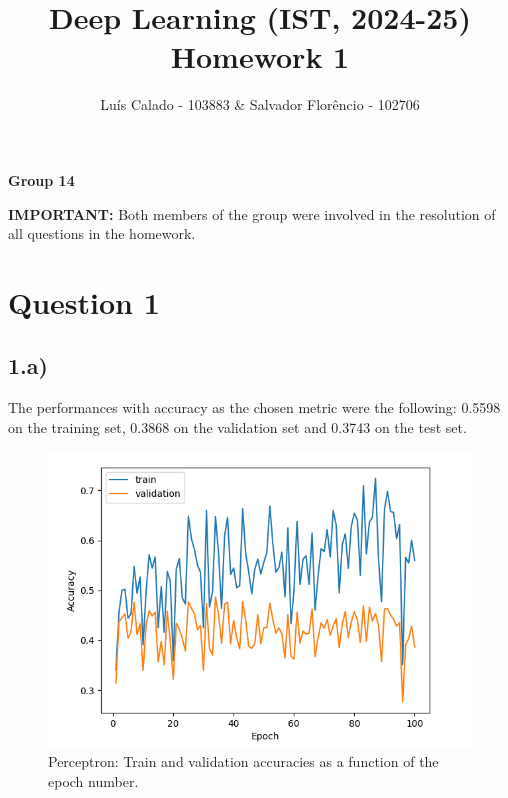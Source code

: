 \documentclass[a4paper, 12pt]{article}
\title{\textbf{Deep Learning (IST, 2024-25) \\ Homework 1}}
\author{Luís Calado - 103883 \& Salvador Florêncio - 102706}
\date{}
\begin{document}
\maketitle
\vspace{-0.8cm}
\begin{center}
    \textbf{Group 14}
\end{center}


\begin{tcolorbox}[colframe=black, colback=white, sharp corners, boxrule=1pt, width=\textwidth]

\textbf{IMPORTANT:} Both members of the group were involved in the resolution of all questions in the homework.
\end{tcolorbox}


\maketitle

\section*{Question 1}

\subsection*{1.a)} The performances with accuracy as the chosen metric were the following: 0.5598 on the training set, 0.3868 on the validation set and 0.3743 on the test set.
\vspace{-0.2 cm}
\begin{figure}[H]
    \centering
    \includegraphics[width=1\textwidth]{plot/q1_1a.png}
    \caption{Perceptron: Train and validation accuracies as a function of the epoch number.}
\end{figure}
\end{document}
